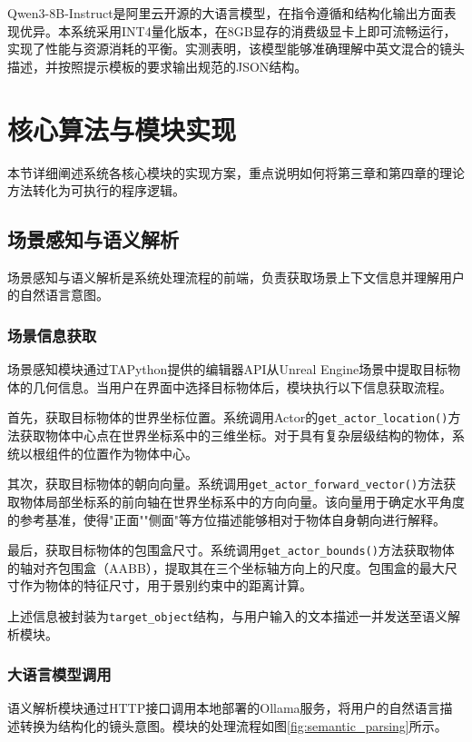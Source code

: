 Qwen3-8B-Instruct是阿里云开源的大语言模型，在指令遵循和结构化输出方面表现优异。本系统采用INT4量化版本，在8GB显存的消费级显卡上即可流畅运行，实现了性能与资源消耗的平衡。实测表明，该模型能够准确理解中英文混合的镜头描述，并按照提示模板的要求输出规范的JSON结构。

\section{核心算法与模块实现}

本节详细阐述系统各核心模块的实现方案，重点说明如何将第三章和第四章的理论方法转化为可执行的程序逻辑。

\subsection{场景感知与语义解析}

场景感知与语义解析是系统处理流程的前端，负责获取场景上下文信息并理解用户的自然语言意图。

\subsubsection{场景信息获取}

场景感知模块通过TAPython提供的编辑器API从Unreal Engine场景中提取目标物体的几何信息。当用户在界面中选择目标物体后，模块执行以下信息获取流程。

首先，获取目标物体的世界坐标位置。系统调用Actor的\texttt{get\_actor\_location()}方法获取物体中心点在世界坐标系中的三维坐标。对于具有复杂层级结构的物体，系统以根组件的位置作为物体中心。

其次，获取目标物体的朝向向量。系统调用\texttt{get\_actor\_forward\_vector()}方法获取物体局部坐标系的前向轴在世界坐标系中的方向向量。该向量用于确定水平角度的参考基准，使得"正面""侧面"等方位描述能够相对于物体自身朝向进行解释。

最后，获取目标物体的包围盒尺寸。系统调用\texttt{get\_actor\_bounds()}方法获取物体的轴对齐包围盒（AABB），提取其在三个坐标轴方向上的尺度。包围盒的最大尺寸作为物体的特征尺寸，用于景别约束中的距离计算。

上述信息被封装为\texttt{target\_object}结构，与用户输入的文本描述一并发送至语义解析模块。

\subsubsection{大语言模型调用}

语义解析模块通过HTTP接口调用本地部署的Ollama服务，将用户的自然语言描述转换为结构化的镜头意图。模块的处理流程如图\ref{fig:semantic_parsing}所示。

